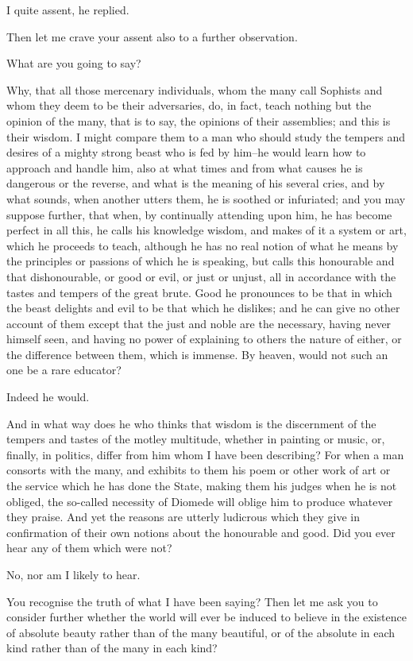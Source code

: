 I quite assent, he replied.

Then let me crave your assent also to a further observation.

What are you going to say?

Why, that all those mercenary individuals, whom the many call Sophists
and whom they deem to be their adversaries, do, in fact, teach nothing
but the opinion of the many, that is to say, the opinions of their
assemblies; and this is their wisdom. I might compare them to a man who
should study the tempers and desires of a mighty strong beast who is
fed by him--he would learn how to approach and handle him, also at what
times and from what causes he is dangerous or the reverse, and what
is the meaning of his several cries, and by what sounds, when another
utters them, he is soothed or infuriated; and you may suppose further,
that when, by continually attending upon him, he has become perfect in
all this, he calls his knowledge wisdom, and makes of it a system or
art, which he proceeds to teach, although he has no real notion of what
he means by the principles or passions of which he is speaking, but
calls this honourable and that dishonourable, or good or evil, or just
or unjust, all in accordance with the tastes and tempers of the great
brute. Good he pronounces to be that in which the beast delights and
evil to be that which he dislikes; and he can give no other account
of them except that the just and noble are the necessary, having never
himself seen, and having no power of explaining to others the nature
of either, or the difference between them, which is immense. By heaven,
would not such an one be a rare educator?

Indeed he would.

And in what way does he who thinks that wisdom is the discernment of
the tempers and tastes of the motley multitude, whether in painting
or music, or, finally, in politics, differ from him whom I have been
describing? For when a man consorts with the many, and exhibits to
them his poem or other work of art or the service which he has done
the State, making them his judges when he is not obliged, the so-called
necessity of Diomede will oblige him to produce whatever they
praise. And yet the reasons are utterly ludicrous which they give in
confirmation of their own notions about the honourable and good. Did you
ever hear any of them which were not?

No, nor am I likely to hear.

You recognise the truth of what I have been saying? Then let me ask you
to consider further whether the world will ever be induced to believe in
the existence of absolute beauty rather than of the many beautiful, or
of the absolute in each kind rather than of the many in each kind?

